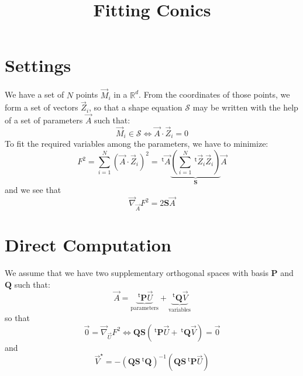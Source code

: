 \documentclass[aps]{revtex4}
\newcommand{\mymat}[1]{\boldsymbol{#1}}
\newcommand{\mytrn}[1]{~^{\mathsf{t}}\!{#1}}
\newcommand{\mygrad}{\vec{\nabla}}
\begin{document}
\title{Fitting Conics}
\maketitle
\section{Settings}

We have a set of $N$ points $\vec{M}_i$ in a $\mathbb{R}^d$.
From the coordinates of those points, we form a set of vectors $\vec{Z}_i$,
so that a shape equation $\mathcal{S}$ may be written with the help of a set of parameters $\vec{A}$
such that:
\begin{equation}
\vec{M}_i\in\mathcal{S} \Leftrightarrow \vec{A}\cdot\vec{Z}_i = 0
\end{equation}
To fit the required variables among the parameters, we have to minimize:
\begin{equation}
 F^2 = \sum_{i=1}^N \left(\vec{A}\cdot\vec{Z}_i\right)^2
  = \mytrn{\vec{A}} \underbrace{\left(\sum_{i=1}^N\mytrn{\vec{Z}_i}\vec{Z}_i\right)}_{\mymat{S}} \vec{A}
\end{equation}
and we see that
\begin{equation}
	\mygrad_{\vec{A}} F^2 = 2 \mymat{S} \vec{A}
\end{equation}

\section{Direct Computation}
We assume that we have two supplementary orthogonal spaces with basis $\mymat{P}$ and $\mymat{Q}$ such that:
\begin{equation}
	\vec{A} = \underbrace{\mytrn{\mymat{P}} \vec{U}}_{\text{parameters}} + \underbrace{\mytrn{\mymat{Q}} \vec{V}}_{\text{variables}}
\end{equation}
so that
\begin{equation}
 \vec{0} = \mygrad_{\vec{U}} F^2 \Leftrightarrow \mymat{Q}\mymat{S}\left(\mytrn{\mymat{P}} \vec{U} + \mytrn{\mymat{Q}} \vec{V}\right) = \vec{0}
\end{equation}
and
\begin{equation}
	\vec{V}^\star = -\left(\mymat{Q}\mymat{S}  \mytrn{\mymat{Q}}\right)^{-1} \left(\mymat{Q}\mymat{S} \mytrn{\mymat{P}} \vec{U}\right)
\end{equation}
\end{document}
